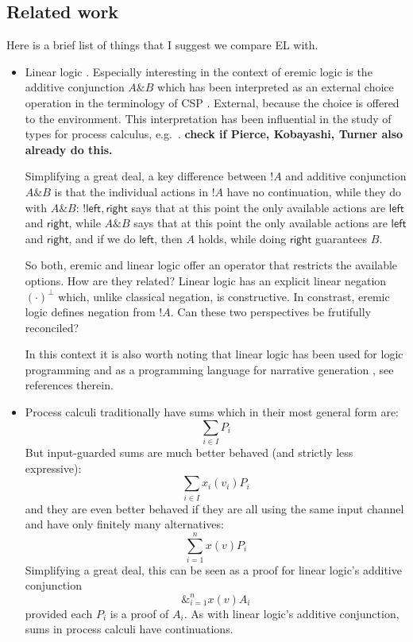 \subsection{Related work}

Here is a brief list of things that I suggest we compare EL with.

\begin{itemize}

\item Linear logic \cite{GirardJY:linlog,GirardJY:protyp}. Especially
  interesting in the context of eremic logic is the additive
  conjunction $A \& B$ which has been interpreted
  \cite{AbramskyS:comintoll} as an external choice operation in the
  terminology of CSP \cite{HoareC:comseq}. External, because the
  choice is offered to the environment. This interpretation has been
  influential in the study of types for process calculus,
  e.g.~\cite{HondaK:unitypsfsifLONG,TakeuchiK:intbaslaits,HondaK:lanpriatdfscbp}. \textbf{check
    if Pierce, Kobayashi, Turner also already do this.}

  Simplifying a great deal, a key difference between $!A$ and additive
  conjunction $A \& B$ is that the individual actions in $!A$ have no
  continuation, while they do with $A \& B$: $!{\mathsf{left},
    \mathsf{right}}$ says that at this point the only available
  actions are $\mathsf{left}$ and $\mathsf{right}$, while $A \& B$
  says that at this point the only available actions are
  $\mathsf{left}$ and $\mathsf{right}$, and if we do $\mathsf{left}$,
  then $A$ holds, while doing $\mathsf{right}$ guarantees $B$.

  So both, eremic and linear logic offer an operator that restricts
  the available options. How are they related? Linear logic has an
  explicit linear negation $(\cdot)^{\bot}$ which, unlike classical
  negation, is constructive. In constrast, eremic logic defines
  negation from $!A$. Can these two perspectives be frutifully
  reconciled?

  In this context it is also worth noting that linear logic has been
  used for logic programming
  \cite{HodasJS:logproiafoill,WinikoffMD:logprowll,PymDJ:uniprotiollp,HarlandJ:prolygao,MillerD:surlinlp}
  and as a programming language for narrative generation
  \cite{BosserAG:linlogpfng}, see references therein.


\item Process calculi traditionally 
  have sums which in their most general form are:
  \[
     \sum_{i \in I} P_i
  \]
  But input-guarded sums are much better behaved (and strictly less
  expressive):
  \[
     \sum_{i \in I} x_{i}(v_i)P_i
  \]
  and they are even better behaved if they are all using the same
  input channel and have only finitely many alternatives:
  \[
     \sum_{i = 1}^n x(v)P_i
  \]
  Simplifying a great deal, this can be seen as a proof for linear
  logic's additive conjunction
  \[
     \&_{i = 1}^n x(v)A_i
  \]
  provided each $P_i$ is a proof of $A_i$.  As with linear logic's
  additive conjunction, sums in process calculi have continuations.

\end{itemize}
